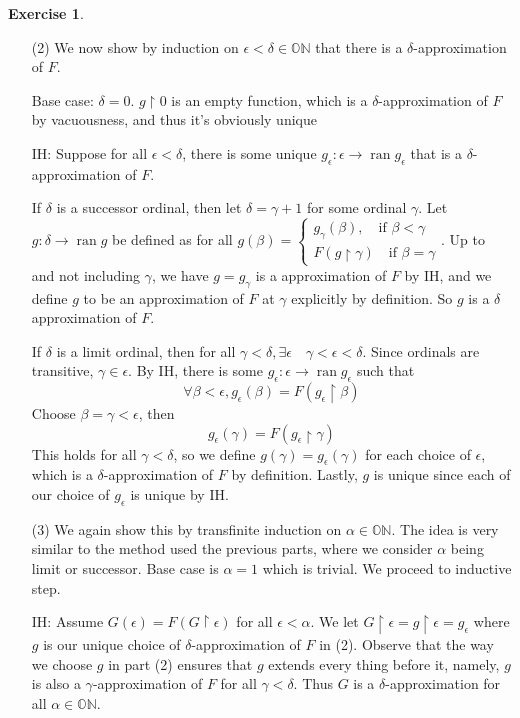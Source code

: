 \documentclass{article}
\theoremstyle{definition}
\newtheorem{exercise}{Exercise}[section]
\begin{document}
\begin{exercise}
\begin{itemize}
            \item[(2)]We now show by induction on $\epsilon < \delta \in \mathbb{ON}$ that there is a $\delta$-approximation of $F$.

            Base case: $\delta = 0$. $g\upharpoonright 0$ is an empty function, which is a $\delta$-approximation of $F$ by vacuousness, and thus it's obviously unique

            IH: Suppose for all $\epsilon < \delta$, there is some unique $g_\epsilon: \epsilon \rightarrow \operatorname{ran} g_\epsilon$ that is a $\delta$-approximation of $F$.

            If $\delta$ is a successor ordinal, then let $\delta = \gamma + 1$ for some ordinal $\gamma$. Let $g: \delta \rightarrow \operatorname{ran} g$ be defined as for all $g(\beta) = \begin{cases}
                g_\gamma(\beta), \quad \text{if $\beta < \gamma$}\\
                F(g\upharpoonright \gamma) \quad \text{if $\beta = \gamma$}
            \end{cases}$. Up to and not including $\gamma$, we have $g = g_\gamma$ is a approximation of $F$ by IH, and we define $g$ to be an approximation of $F$ at $\gamma$ explicitly by definition. So $g$ is a $\delta$ approximation of $F$.

            If $\delta$ is a limit ordinal, then for all $\gamma < \delta, \exists \epsilon \quad \gamma < \epsilon < \delta$. Since ordinals are transitive, $\gamma \in \epsilon$. By IH, there is some $g_\epsilon: \epsilon \rightarrow \operatorname{ran} g_\epsilon$ such that 
            $$\forall \beta < \epsilon, g_\epsilon(\beta) = F(g_\epsilon \upharpoonright \beta)$$
            Choose $\beta = \gamma < \epsilon$, then
            $$ g_\epsilon(\gamma) = F(g_\epsilon \upharpoonright \gamma)$$
            This holds for all $\gamma < \delta$, so we define $g(\gamma) = g_\epsilon(\gamma)$ for each choice of $\epsilon$, which is a $\delta$-approximation of $F$ by definition. Lastly, $g$ is unique since each of our choice of $g_\epsilon$ is unique by IH.

            \item[(3)] We again show this by transfinite induction on $\alpha \in \mathbb{ON}$. The idea is very similar to the method used the previous parts, where we consider $\alpha$ being limit or successor. Base case is $\alpha = 1$ which is trivial. We proceed to inductive step.

            IH: Assume $G(\epsilon) = F(G \upharpoonright \epsilon)$ for all $\epsilon<\alpha$.
            We let $G \upharpoonright \epsilon = g\upharpoonright \epsilon = g_\epsilon$ where $g$ is our unique choice of $\delta$-approximation of $F$ in (2). Observe that the way we choose $g$ in part (2) ensures that $g$ extends every thing before it, namely, $g$ is also a $\gamma$-approximation of $F$ for all $\gamma < \delta$. Thus $G$ is a $\delta$-approximation for all $\alpha \in \mathbb{ON}$.


\end{itemize}
\end{exercise}
\end{document}
